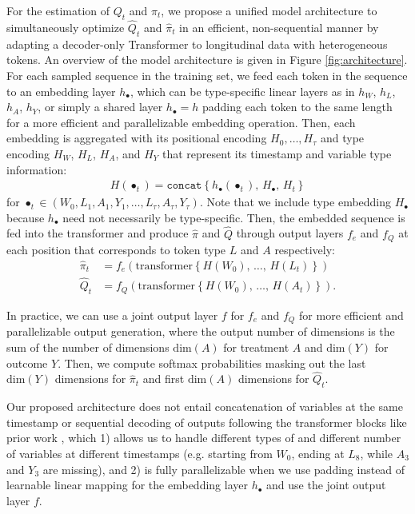 \documentclass{article}
\theoremstyle{plain}
\theoremstyle{definition}
\theoremstyle{remark}
\begin{document}
For the estimation of $Q_t$ and $\pi_t$, we propose a unified model architecture to simultaneously optimize $\hat{Q}_t$ and $\hat{\pi}_t$ in an efficient, non-sequential manner by adapting a decoder-only Transformer \cite{vaswani2017a, brown2020language} to longitudinal data with heterogeneous tokens. An overview of the model architecture is given in Figure \ref{fig:architecture}. For each sampled sequence in the training set, we feed each token in the sequence to an embedding layer $h_\bullet$, which can be type-specific linear layers as in $h_W$, $h_L$, $h_A$, $h_Y$, or simply a shared layer $h_\bullet = h$ padding each token to the same length for a more efficient and parallelizable embedding operation. Then, each embedding is aggregated with its positional encoding $H_0, \ldots, H_\tau$ and type encoding $H_W$, $H_L$, $H_A$, and $H_Y$ that represent its timestamp and variable type information:
\begin{align}
    H(\bullet_t) = \texttt{concat}\left\{ h_\bullet(\bullet_t), \, H_\bullet, \, H_t \right\}
\end{align}
for $\bullet_t \in (W_0, L_1, A_1, Y_1, \ldots, L_\tau, A_\tau, Y_\tau)$. Note that we include type embedding $H_\bullet$ because $h_\bullet$ need not necessarily be type-specific. Then, the embedded sequence is fed into the transformer and produce $\hat{\pi}$ and $\hat{Q}$ through output layers $f_e$ and $f_Q$ at each position that corresponds to token type $L$ and $A$ respectively:
\begin{align}
    \hat{\pi}_t &= f_e(\mathrm{transformer}\left\{H(W_0), \, \ldots, \, H(L_t)\right\}) \\
    \hat{Q}_t &= f_Q(\mathrm{transformer}\left\{H(W_0), \, \ldots, \, H(A_t)\right\}).
\end{align}

In practice, we can use a joint output layer $f$ for $f_e$ and $f_Q$ for more efficient and parallelizable output generation, where the output number of dimensions is the sum of the number of dimensions $\mathrm{dim}(A)$ for treatment $A$ and $\mathrm{dim}(Y)$ for outcome $Y$. Then, we compute softmax probabilities masking out the last $\mathrm{dim}(Y)$ dimensions for $\hat{\pi}_t$ and first $\mathrm{dim}(A)$ dimensions for $\hat{Q}_t$.

Our proposed architecture does not entail concatenation of variables at the same timestamp or sequential decoding of outputs following the transformer blocks like prior work \citet{pmlr-v162-melnychuk22a}, which 1) allows us to handle different types of and different number of variables at different timestamps (e.g. starting from $W_0$, ending at $L_8$, while $A_3$ and $Y_3$ are missing), and 2) is fully parallelizable when we use padding instead of learnable linear mapping for the embedding layer $h_\bullet$ and use the joint output layer $f$.
\end{document}
